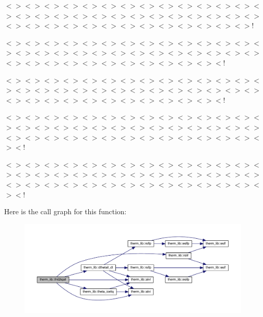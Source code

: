 $<$$>$$<$$>$$<$$>$$<$$>$$<$$>$$<$$>$$<$$>$$<$$>$$<$$>$$<$$>$$<$$>$$<$$>$$<$$>$$<$$>$$<$$>$$<$$>$$<$$>$$<$$>$$<$$>$$<$$>$$<$$>$$<$$>$$<$$>$$<$$>$$<$$>$$<$$>$$<$$>$$<$$>$$<$$>$$<$$>$$<$$>$$<$$>$$<$$>$$<$$>$$<$$>$$<$$>$$<$$>$$<$$>$$<$$>$$<$$>$!

$<$$>$$<$$>$$<$$>$$<$$>$$<$$>$$<$$>$$<$$>$$<$$>$$<$$>$$<$$>$$<$$>$$<$$>$$<$$>$$<$$>$$<$$>$$<$$>$$<$$>$$<$$>$$<$$>$$<$$>$$<$$>$$<$$>$$<$$>$$<$$>$$<$$>$$<$$>$$<$$>$$<$$>$$<$$>$$<$$>$$<$$>$$<$$>$$<$$>$$<$$>$$<$$>$$<$$>$$<$$>$$<$$>$$<$!

$<$$>$$<$$>$$<$$>$$<$$>$$<$$>$$<$$>$$<$$>$$<$$>$$<$$>$$<$$>$$<$$>$$<$$>$$<$$>$$<$$>$$<$$>$$<$$>$$<$$>$$<$$>$$<$$>$$<$$>$$<$$>$$<$$>$$<$$>$$<$$>$$<$$>$$<$$>$$<$$>$$<$$>$$<$$>$$<$$>$$<$$>$$<$$>$$<$$>$$<$$>$$<$$>$$<$$>$$<$$>$$<$$>$$<$!

$<$$>$$<$$>$$<$$>$$<$$>$$<$$>$$<$$>$$<$$>$$<$$>$$<$$>$$<$$>$$<$$>$$<$$>$$<$$>$$<$$>$$<$$>$$<$$>$$<$$>$$<$$>$$<$$>$$<$$>$$<$$>$$<$$>$$<$$>$$<$$>$$<$$>$$<$$>$$<$$>$$<$$>$$<$$>$$<$$>$$<$$>$$<$$>$$<$$>$$<$$>$$<$$>$$<$$>$$<$$>$$<$$>$$<$$>$$<$$>$$<$$>$$<$!

$<$$>$$<$$>$$<$$>$$<$$>$$<$$>$$<$$>$$<$$>$$<$$>$$<$$>$$<$$>$$<$$>$$<$$>$$<$$>$$<$$>$$<$$>$$<$$>$$<$$>$$<$$>$$<$$>$$<$$>$$<$$>$$<$$>$$<$$>$$<$$>$$<$$>$$<$$>$$<$$>$$<$$>$$<$$>$$<$$>$$<$$>$$<$$>$$<$$>$$<$$>$$<$$>$$<$$>$$<$$>$$<$$>$$<$$>$$<$$>$$<$$>$$<$! 

Here is the call graph for this function\+:\nopagebreak
\begin{figure}[H]
\begin{center}
\leavevmode
\includegraphics[width=350pt]{namespacetherm__lib_a8fda8004633d91addcf1c6004df3bd88_cgraph}
\end{center}
\end{figure}


\hypertarget{namespacetherm__lib_a0285be7469fbc289302f23bd321fce36}{}
